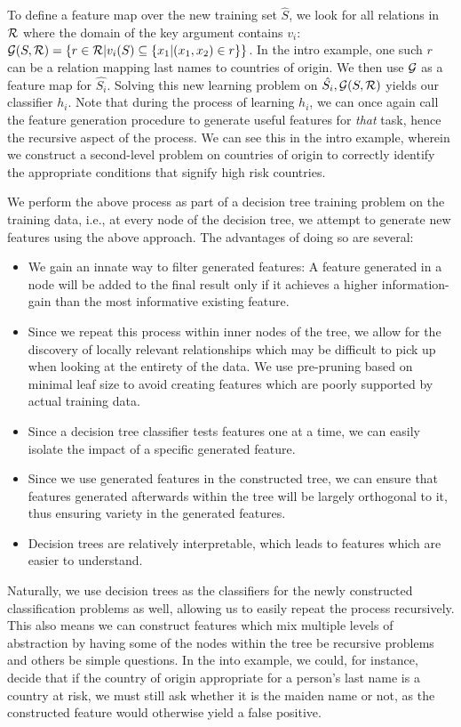 \documentclass{article}
\theoremstyle{definition}
\begin{document}
To define a feature map over the new training set $\hat{S}$, we look for all relations in $\cal R$ where the domain of the key argument contains $v_i$:
${\cal G}(S,{\cal R}) = \left\{ r \in {\cal R} | v_i(S) \subseteq \{x_1 | (x_1,x_2) \in r\}\right\}$. In the intro example, one such $r$ can be a relation mapping last names to countries of origin. We then use ${\cal G}$ as a feature map for $\hat{S_i}$.
Solving this new learning problem on $\hat{S_i}, {\cal G}(S,{\cal R})$ yields our classifier $h_{i}$.
Note that during the process of learning $h_{i}$, we can once again call the feature generation procedure to generate useful features for \emph{that} task, hence the recursive aspect of the process. We can see this in the intro example, wherein we construct a second-level problem on countries of origin to correctly identify the appropriate conditions that signify high risk countries.

We perform the above process as part of a decision tree training problem on the training data, i.e., at every node of the decision tree, we attempt to generate new features using the above approach. The advantages of doing so are several:
\begin{itemize}
	\item We gain an innate way to filter generated features: A feature generated in a node will be added to the final result only if it achieves a higher information-gain than the most informative existing feature. %
	\item Since we repeat this process within inner nodes of the tree, we allow for the discovery of locally relevant relationships which may be difficult to pick up when looking at the entirety of the data. We use pre-pruning based on minimal leaf size to avoid creating features which are poorly supported by actual training data.
	\item Since a decision tree classifier tests features one at a time, we can easily isolate the impact of a specific generated feature.
	\item Since we use generated features in the constructed tree, we can ensure that features generated afterwards within the tree will be largely orthogonal to it, thus ensuring variety in the generated features. %
	\item Decision trees are relatively interpretable, which leads to features which are easier to understand.
\end{itemize}
Naturally, we use decision trees as the classifiers for the newly constructed classification problems as well, allowing us to easily repeat the process recursively. This also means we can construct features which mix multiple levels of abstraction by having some of the nodes within the tree be recursive problems and others be simple questions. In the into example, we could, for instance, decide that if the country of origin appropriate for a person's last name is a country at risk, we must still ask whether it is the maiden name or not, as the constructed feature would otherwise yield a false positive.
\end{document}
